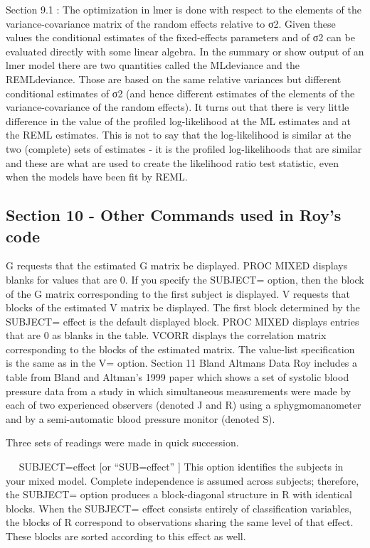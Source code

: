 Section 9.1 : The optimization in lmer is done with respect to the elements of the variance-covariance matrix of the random effects relative to σ2. Given these values the conditional estimates of the fixed-effects parameters and of σ2 can be evaluated directly with some linear algebra. In the summary or show output of an lmer model there are two quantities called the MLdeviance and the REMLdeviance. 
Those are based on the same relative variances but different conditional estimates of σ2 (and hence different estimates of the elements of the variance-covariance of the random effects). It turns out that there is very little difference in the value of the profiled log-likelihood at the ML estimates and at the REML estimates. 
This is not to say that the log-likelihood is similar at the two (complete) sets of estimates - it is the profiled log-likelihoods that are similar and these are what are used to create the likelihood ratio test statistic, even when the models have been fit by REML.

\subsection*{Section 10 - Other Commands used in Roy’s code}

G requests that the estimated G matrix be displayed. PROC MIXED displays blanks for values that are 0. 
If you specify the SUBJECT= option, then the block of the  G matrix corresponding to the first subject is displayed. 
V requests that blocks of the estimated V matrix be displayed. The first block determined by the SUBJECT= effect is the default displayed block. PROC MIXED displays entries that are 0 as blanks in the table. 
VCORR displays the correlation matrix corresponding to the blocks of the estimated  matrix. 
The value-list specification is the same as in the V= option. 
Section 11 Bland Altmans Data
Roy includes a table from Bland and Altman’s 1999 paper which shows a set of systolic blood pressure data from a study in which simultaneous measurements were made by each of two experienced observers (denoted J and R) using a sphygmomanometer and by a semi-automatic blood pressure monitor (denoted S).

 Three sets of readings were made in quick succession.


 
SUBJECT=effect 	[or “SUB=effect” ]
This option identifies the subjects in your mixed model. 
Complete independence is assumed across subjects; therefore, the SUBJECT= option produces a block-diagonal structure in R with identical blocks. 
When the SUBJECT= effect consists entirely of classification variables, the blocks of  R correspond to observations sharing the same level of that effect. 
These blocks are sorted according to this effect as well. 

